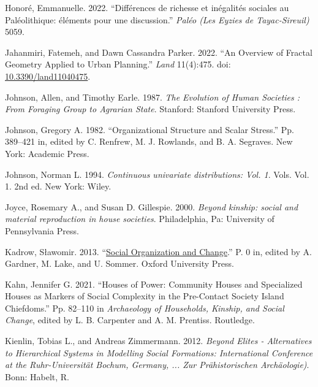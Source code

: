 \documentclass[
  12pt,
]{book}
\newlength{\cslhangindent}
\newlength{\cslentryspacingunit} %
\newenvironment{CSLReferences}[2] %
 {%
  \setlength{\parindent}{0pt}
  \ifodd #1
  \let\oldpar\par
  \def\par{\hangindent=\cslhangindent\oldpar}
  \fi
  \setlength{\parskip}{#2\cslentryspacingunit}
 }%
 {}
\begin{document}
\begin{CSLReferences}{1}{0}
\leavevmode{}%
Honoré, Emmanuelle. 2022. {``Différences de richesse et inégalités sociales au Paléolithique: éléments pour une discussion.''} \emph{Paléo (Les Eyzies de Tayac-Sireuil)} 5059.

\leavevmode{}%
Jahanmiri, Fatemeh, and Dawn Cassandra Parker. 2022. {``An Overview of Fractal Geometry Applied to Urban Planning.''} \emph{Land} 11(4):475. doi: \href{https://doi.org/10.3390/land11040475}{10.3390/land11040475}.

\leavevmode{}%
Johnson, Allen, and Timothy Earle. 1987. \emph{The Evolution of Human Societies : From Foraging Group to Agrarian State}. Stanford: Stanford University Press.

\leavevmode{}%
Johnson, Gregory A. 1982. {``Organizational Structure and Scalar Stress.''} Pp. 389--421 in, edited by C. Renfrew, M. J. Rowlands, and B. A. Segraves. New York: Academic Press.

\leavevmode{}%
Johnson, Norman L. 1994. \emph{Continuous univariate distributions: Vol. 1}. Vols. Vol. 1. 2nd ed. New York: Wiley.

\leavevmode{}%
Joyce, Rosemary A., and Susan D. Gillespie. 2000. \emph{Beyond kinship: social and material reproduction in house societies}. Philadelphia, Pa: University of Pennsylvania Press.

\leavevmode{}%
Kadrow, Sławomir. 2013. {``\href{https://doi.org/10.1093/oxfordhb/9780199567942.013.023}{Social Organization and Change}.''} P. 0 in, edited by A. Gardner, M. Lake, and U. Sommer. Oxford University Press.

\leavevmode{}%
Kahn, Jennifer G. 2021. {``Houses of Power: {Community} Houses and Specialized Houses as Markers of Social Complexity in the Pre-Contact {Society Island} Chiefdoms.''} Pp. 82--110 in \emph{Archaeology of {Households}, {Kinship}, and {Social Change}}, edited by L. B. Carpenter and A. M. Prentiss. {Routledge}.

\leavevmode{}%
Kienlin, Tobias L., and Andreas Zimmermann. 2012. \emph{Beyond Elites - Alternatives to Hierarchical Systems in Modelling Social Formations: International Conference at the Ruhr-Universität Bochum, Germany, ... Zur Prähistorischen Archäologie)}. Bonn: Habelt, R.


\end{CSLReferences}
\end{document}
